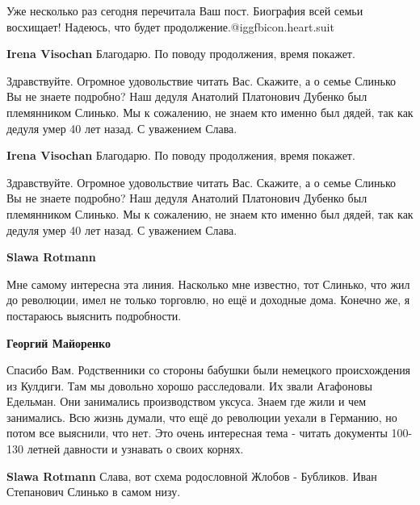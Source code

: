 \begin{itemize}
\begin{itemize}
\end{itemize} %


Уже несколько раз сегодня перечитала Ваш пост. Биография всей семьи
восхищает! Надеюсь, что будет продолжение.@igg{fbicon.heart.suit}

\begin{itemize} %
\textbf{Irena Visochan} Благодарю. По поводу продолжения, время покажет.
\end{itemize} %


Здравствуйте. Огромное удовольствие читать Вас. Скажите, а о семье Слинько Вы
не знаете подробно? Наш дедуля Анатолий Платонович Дубенко был племянником
Слинько. Мы к сожалению, не знаем кто именно был дядей, так как дедуля умер 40
лет назад. С уважением Слава.

\begin{itemize} %
\textbf{Irena Visochan} Благодарю. По поводу продолжения, время покажет.
\end{itemize} %


Здравствуйте. Огромное удовольствие читать Вас. Скажите, а о семье Слинько Вы
не знаете подробно? Наш дедуля Анатолий Платонович Дубенко был племянником
Слинько. Мы к сожалению, не знаем кто именно был дядей, так как дедуля умер 40
лет назад. С уважением Слава.

\begin{itemize} %
\textbf{Slawa Rotmann} 

Мне самому интересна эта линия. Насколько мне известно, тот Слинько, что жил до
революции, имел не только торговлю, но ещё и доходные дома. Конечно же, я
постараюсь выяснить подробности.

\begin{itemize} %
\textbf{Георгий Майоренко} 

Спасибо Вам. Родственники со стороны бабушки были немецкого происхождения из
Кулдиги. Там мы довольно хорошо расследовали. Их звали Агафоновы Едельман. Они
занимались производством уксуса. Знаем где жили и чем занимались. Всю жизнь
думали, что ещё до революции уехали в Германию, но потом все выяснили, что нет.
Это очень интересная тема - читать документы 100-130 летней давности и узнавать
о своих корнях.

\textbf{Slawa Rotmann} Слава, вот схема родословной Жлобов - Бубликов. Иван Степанович Слинько в самом низу.


\end{itemize}
\end{itemize}
\end{itemize}
